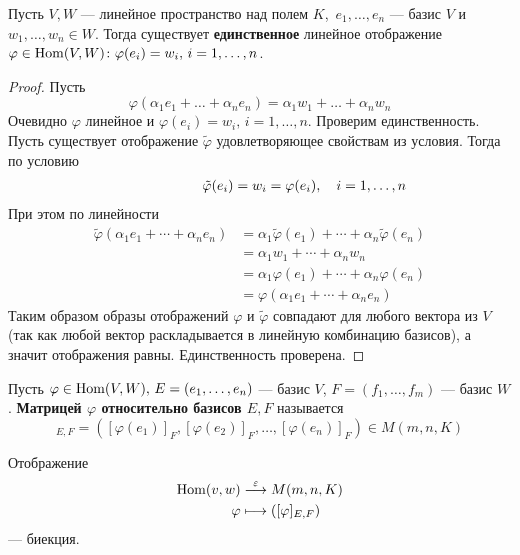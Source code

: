 \documentclass[../main.tex]{subfiles}
\begin{document}
\begin{theorem-non}
  Пусть $V, W$ --- линейное пространство над полем $K$,\ $e_1, \dotsc, e_n$ --- базис $V$ и $w_1, \dotsc, w_n \in W$. Тогда существует \textbf{единственное} линейное отображение $\varphi \in \operatorname{Hom}(V, W)\colon \varphi(e_i) = w_i,\, i = 1,\dotsc,n$.
\end{theorem-non}
\begin{proof}
  Пусть
  \begin{equation*}
    \varphi(\alpha_1 e_1 + \dotsc + \alpha_n e_n) = \alpha_1 w_1 + \dotsc + \alpha_n w_n
  \end{equation*}
  Очевидно $\varphi$ линейное и $\varphi(e_i) = w_i,\, i = 1,\dotsc,n$. Проверим единственность. Пусть существует отображение $\tilde{\varphi}$ удовлетворяющее свойствам из условия. Тогда по условию
  \begin{align*}
    \hphantom{,\quad i = 1,\dotsc, n}
    \tilde{\varphi}(e_i) = w_i = \varphi(e_i),\quad i = 1,\dotsc, n
  \end{align*}
  При этом по линейности
  \begin{align*}
    \tilde{\varphi}(\alpha_1 e_1 + \dotsb + \alpha_n  e_n)
    &=
    \alpha_1 \tilde{\varphi}(e_1) + \dotsb + \alpha_n \tilde{\varphi}(e_n)
    \\&=
    \alpha_1 w_1 + \dotsb + \alpha_n w_n
    \\&=
    \alpha_1 \varphi(e_1) + \dotsb + \alpha_n \varphi(e_n)
    \\&=
    \varphi(\alpha_1 e_1 + \dotsb + \alpha_n e_n)
  \end{align*}
  Таким образом образы отображений $\varphi$ и $\tilde{\varphi}$ совпадают для любого вектора из $V$(так как любой вектор раскладывается в линейную комбинацию базисов), а значит отображения равны. Единственность проверена.
\end{proof}

\begin{definition}
\label{def:7.1}
  Пусть $\varphi \in \operatorname{Hom}(V, W),\, E = (e_1, \dotsc, e_n)$ --- базис $V$, $F = (f_1, \dotsc, f_m)$ --- базис $W$. \textbf{Матрицей $\varphi$ относительно базисов $E, F$} называется
  \begin{equation*}
    [\varphi]_{E, F} = ([\varphi(e_1)]_F, [\varphi(e_2)]_F, \dotsc, [\varphi(e_n)]_F) \in M(m, n, K)
  \end{equation*}
\end{definition}

\begin{corollary*}
  Отображение
  \begin{align*}
    \operatorname{Hom}(v, w) &\overset{\varepsilon}{\longrightarrow} M(m, n, K) \\
    \varphi &\longmapsto([\varphi]_{E, F})
  \end{align*}
  --- биекция.
\end{corollary*}
\end{document}
